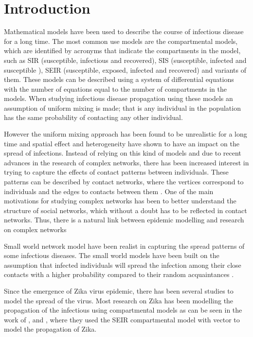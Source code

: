 \chapter{Introduction}
 Mathematical models have been used to describe the course of infectious disease for a long time. The most common use models are the compartmental models, which are identified by acronyms that indicate the compartments in the model, such as SIR (susceptible, infectious and recovered), SIS (susceptible, infected and susceptible ), SEIR  (susceptible, exposed, infected and recovered) and variants of them. These models can be described using a system of differential equations with the number of equations equal to the number of compartments in the models. When studying infectious disease propagation using these models an assumption of uniform mixing is made; that is any individual in the population has the same probability of contacting any other individual.
 
 However the uniform mixing approach has been found to be unrealistic for a long time and spatial effect and heterogeneity have shown to have an impact on the spread of infections. Instead of relying on this kind of models and due to recent advances in the research of complex networks, there has been increased interest in trying to capture the effects of contact patterns between individuals. These patterns can be described by contact networks, where the vertices correspond to individuals and the edges to contacts between them  \citep{wallinga1999perspective}. One of the main motivations for studying complex networks has been to better understand the structure of social networks, which without a doubt has to be reflected in contact networks. Thus, there is a natural link between epidemic modelling and research on complex networks \citep{kaski2005modeling}
 
 Small world network  model have been realist in capturing the spread patterns of some infectious diseases. The small world models have been built on the assumption that infected individuals will spread the infection among their close contacts with a higher probability compared to their random acquaintances \citep{newman2002random}.
 
Since the emergence of Zika virus epidemic, there has been several studies to model the spread of the virus. Most research on Zika has been modelling the propagation of the infectious using compartmental models as can be seen in the work of \cite{1}, \cite{2} and \cite{3}, where they used the SEIR compartmental model with vector to model the propagation of Zika. 

